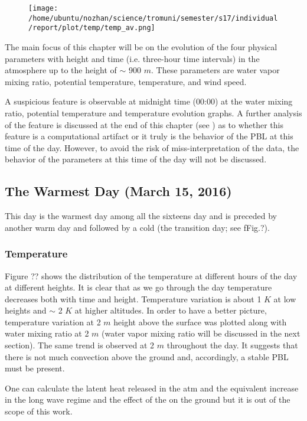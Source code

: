 \documentclass[a4paper,12pt]{article}
\numberwithin{equation}{section} %
\begin{document}
\begin{figure}[H]
	\texttt{[image: /home/ubuntu/nozhan/science/tromuni/semester/s17/individual/report/plot/temp/temp\_av.png]}
\end{figure}

The main focus of this chapter will be on the evolution of the four physical parameters with height and time (i.e. three-hour time intervals) in the atmosphere up to the height of $\sim$ 900 $m$. These parameters are water vapor mixing ratio, potential temperature, temperature, and wind speed.

A suspicious feature is observable at midnight time (00:00) at the water mixing ratio, potential temperature and temperature evolution graphs. A further analysis of the feature is discussed at the end of this chapter (see ) as to whether this feature is a computational artifact or it truly is the behavior of the PBL at this time of the day. However, to avoid the risk of miss-interpretation of the data, the behavior of the parameters at this time of the day will not be discussed.

\subsection{The Warmest Day (March 15, 2016)}

This day is the warmest day among all the sixteens day and is preceded by another warm day and followed by a cold (the transition day; see fFig.?).

\subsubsection{Temperature}

Figure ?? shows the distribution of the temperature at different hours of the day at different heights. It is clear that as we go through the day temperature decreases both with time and height. Temperature variation is about 1 $K$ at low heights and $\sim$ 2 $K$ at higher altitudes. In order to have a better picture, temperature variation at 2 $m$ height above the surface was plotted along with water mixing ratio at 2 $m$ (water vapor mixing ratio will be discussed in the next section). The same trend is observed at 2 $m$ throughout the day. It suggests that there is not much convection above the ground and, accordingly, a stable PBL must be present.

One can calculate the latent heat released in the atm and the equivalent increase in the long wave regime and the effect of the on the ground but it is out of the scope of this work.
\end{document}
